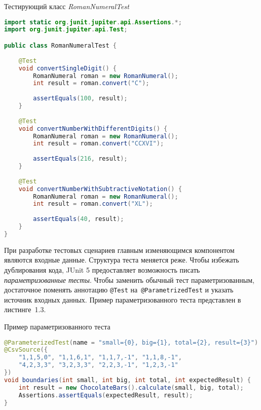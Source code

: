 \begin{ListingEnv}[!h]%
	\captiondelim{ } %
	\caption{Тестирующий класс \textit{RomanNumeralTest}}
	\begin{lstlisting}[language={Java}]
import static org.junit.jupiter.api.Assertions.*;
import org.junit.jupiter.api.Test;

public class RomanNumeralTest {
	
	@Test
	void convertSingleDigit() {
		RomanNumeral roman = new RomanNumeral();
		int result = roman.convert("C");
		
		assertEquals(100, result);
	}
	
	@Test
	void convertNumberWithDifferentDigits() {
		RomanNumeral roman = new RomanNumeral();
		int result = roman.convert("CCXVI");
		
		assertEquals(216, result);
	}
	
	@Test
	void convertNumberWithSubtractiveNotation() {
		RomanNumeral roman = new RomanNumeral();
		int result = roman.convert("XL");
		
		assertEquals(40, result);
	}
}
	\end{lstlisting}
\end{ListingEnv}


При разработке тестовых сценариев главным изменяющимся компонентом являются входные данные. Структура теста меняется реже. Чтобы избежать дублирования кода, JUnit 5 предоставляет возможность писать \textit{параметризованные тесты}. Чтобы заменить обычный тест параметризованным, достаточное поменять аннотацию \texttt{@Test} на~\texttt{@ParametrizedTest} и указать источник входных данных. Пример параметризованного теста представлен в листинге~1.3.

\begin{ListingEnv}[!h]%
	\captiondelim{ } %
	\caption{Пример параметризованного теста}
	\begin{lstlisting}[language={Java}]
@ParameterizedTest(name = "small={0}, big={1}, total={2}, result={3}")
@CsvSource({
	"1,1,5,0", "1,1,6,1", "1,1,7,-1", "1,1,8,-1",
	"4,2,3,3", "3,2,3,3", "2,2,3,-1", "1,2,3,-1"
})
void boundaries(int small, int big, int total, int expectedResult) {
	int result = new ChocolateBars().calculate(small, big, total);
	Assertions.assertEquals(expectedResult, result);
}
	\end{lstlisting}
\end{ListingEnv}
